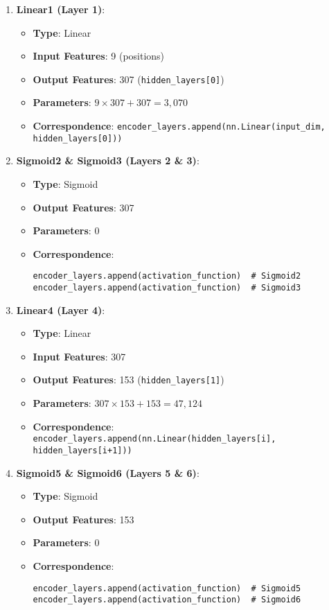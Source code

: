\documentclass[10pt]{article}
\begin{document}
\begin{enumerate}
    \item \textbf{Linear1 (Layer 1)}:
    \begin{itemize}
        \item \textbf{Type}: Linear
        \item \textbf{Input Features}: 9 (positions)
        \item \textbf{Output Features}: 307 (\texttt{hidden\_layers[0]})
        \item \textbf{Parameters}: \( 9 \times 307 + 307 = 3,070 \)
        \item \textbf{Correspondence}: \texttt{encoder\_layers.append(nn.Linear(input\_dim, hidden\_layers[0]))}
    \end{itemize}
    
    \item \textbf{Sigmoid2 \& Sigmoid3 (Layers 2 \& 3)}:
    \begin{itemize}
        \item \textbf{Type}: Sigmoid
        \item \textbf{Output Features}: 307
        \item \textbf{Parameters}: 0
        \item \textbf{Correspondence}:
        \begin{verbatim}
encoder_layers.append(activation_function)  # Sigmoid2
encoder_layers.append(activation_function)  # Sigmoid3
        \end{verbatim}
    \end{itemize}
    
    \item \textbf{Linear4 (Layer 4)}:
    \begin{itemize}
        \item \textbf{Type}: Linear
        \item \textbf{Input Features}: 307
        \item \textbf{Output Features}: 153 (\texttt{hidden\_layers[1]})
        \item \textbf{Parameters}: \( 307 \times 153 + 153 = 47,124 \)
        \item \textbf{Correspondence}: \texttt{encoder\_layers.append(nn.Linear(hidden\_layers[i], hidden\_layers[i+1]))}
    \end{itemize}
    
    \item \textbf{Sigmoid5 \& Sigmoid6 (Layers 5 \& 6)}:
    \begin{itemize}
        \item \textbf{Type}: Sigmoid
        \item \textbf{Output Features}: 153
        \item \textbf{Parameters}: 0
        \item \textbf{Correspondence}:
        \begin{verbatim}
encoder_layers.append(activation_function)  # Sigmoid5
encoder_layers.append(activation_function)  # Sigmoid6
        \end{verbatim}
    \end{itemize}
    

\end{enumerate}
\end{document}
